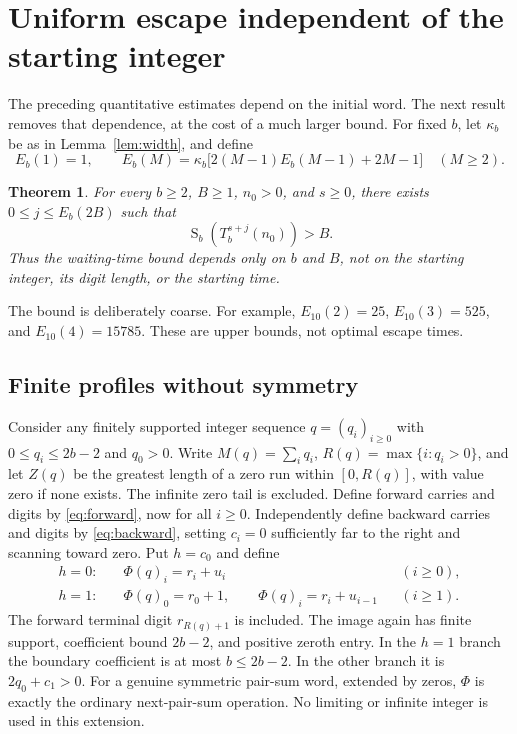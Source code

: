 \documentclass[11pt]{article}
\newtheorem{theorem}{Theorem}
\newcommand{\ds}{\operatorname{S}}
\begin{document}
\section{Uniform escape independent of the starting integer}
The preceding quantitative estimates depend on the initial word. The next
result removes that dependence, at the cost of a much larger bound.
For fixed $b$, let $\kappa_b$ be as in Lemma~\ref{lem:width}, and define
\begin{equation}\label{eq:recursion}
 E_b(1)=1,\qquad
 E_b(M)=\kappa_b\bigl[2(M-1)E_b(M-1)+2M-1\bigr]\quad(M\geq2).
\end{equation}
\begin{theorem}\label{thm:uniform}
For every $b\geq2$, $B\geq1$, $n_0>0$, and $s\geq0$, there exists
$0\leq j\leq E_b(2B)$ such that
\[
 \ds_b(T_b^{s+j}(n_0))>B.
\]
Thus the waiting-time bound depends only on $b$ and $B$, not on the
starting integer, its digit length, or the starting time.
\end{theorem}
The bound is deliberately coarse. For example,
$E_{10}(2)=25$, $E_{10}(3)=525$, and $E_{10}(4)=15785$.
These are upper bounds, not optimal escape times.

\subsection*{Finite profiles without symmetry}
Consider any finitely supported integer sequence $q=(q_i)_{i\geq0}$ with
$0\leq q_i\leq2b-2$ and $q_0>0$. Write
$M(q)=\sum_iq_i$, $R(q)=\max\{i:q_i>0\}$, and let $Z(q)$ be the
greatest length of a zero run within $[0,R(q)]$, with value zero if none
exists. The infinite zero tail is excluded.
Define forward carries and digits by \eqref{eq:forward}, now for all
$i\geq0$. Independently define backward carries and digits by
\eqref{eq:backward}, setting $c_i=0$ sufficiently far to the right and
scanning toward zero. Put $h=c_0$ and define
\begin{equation}\label{eq:halfline}
 \begin{aligned}
 h=0:&\quad \Phi(q)_i=r_i+u_i &&(i\geq0),\\
 h=1:&\quad \Phi(q)_0=r_0+1,\qquad
                 \Phi(q)_i=r_i+u_{i-1} &&(i\geq1).
 \end{aligned}
\end{equation}
The forward terminal digit $r_{R(q)+1}$ is included. The image again has
finite support, coefficient bound $2b-2$, and positive zeroth entry.
In the $h=1$ branch the boundary coefficient is at most $b\leq2b-2$.
In the other branch it is $2q_0+c_1>0$.
For a genuine symmetric pair-sum word, extended by zeros, $\Phi$ is
exactly the ordinary next-pair-sum operation. No limiting or infinite
integer is used in this extension.
\end{document}
